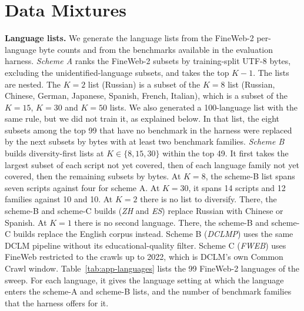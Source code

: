 \section{Data Mixtures}
\label{app:data-mixtures}

\textbf{Language lists.} We generate the language lists from the FineWeb-2 per-language byte counts and from the benchmarks available in the evaluation harness. \emph{Scheme A} ranks the FineWeb-2 subsets by training-split UTF-8 bytes, excluding the unidentified-language subsets, and takes the top $K-1$. The lists are nested. The $K=2$ list (Russian) is a subset of the $K=8$ list (Russian, Chinese, German, Japanese, Spanish, French, Italian), which is a subset of the $K=15$, $K=30$ and $K=50$ lists. We also generated a 100-language list with the same rule, but we did not train it, as explained below. In that list, the eight subsets among the top 99 that have no benchmark in the harness were replaced by the next subsets by bytes with at least two benchmark families. \emph{Scheme B} builds diversity-first lists at $K \in \{8, 15, 30\}$ within the top 49. It first takes the largest subset of each script not yet covered, then of each language family not yet covered, then the remaining subsets by bytes. At $K=8$, the scheme-B list spans seven scripts against four for scheme A. At $K=30$, it spans 14 scripts and 12 families against 10 and 10. At $K=2$ there is no list to diversify. There, the scheme-B and scheme-C builds (\emph{ZH} and \emph{ES}) replace Russian with Chinese or Spanish. At $K=1$ there is no second language. There, the scheme-B and scheme-C builds replace the English corpus instead. Scheme B (\emph{DCLMP}) uses the same DCLM pipeline without its educational-quality filter. Scheme C (\emph{FWEB}) uses FineWeb restricted to the crawls up to 2022, which is DCLM's own Common Crawl window.
Table~\ref{tab:app-languages} lists the 99 FineWeb-2 languages of the sweep. For each language, it gives the language setting at which the language enters the scheme-A and scheme-B lists, and the number of benchmark families that the harness offers for it.




